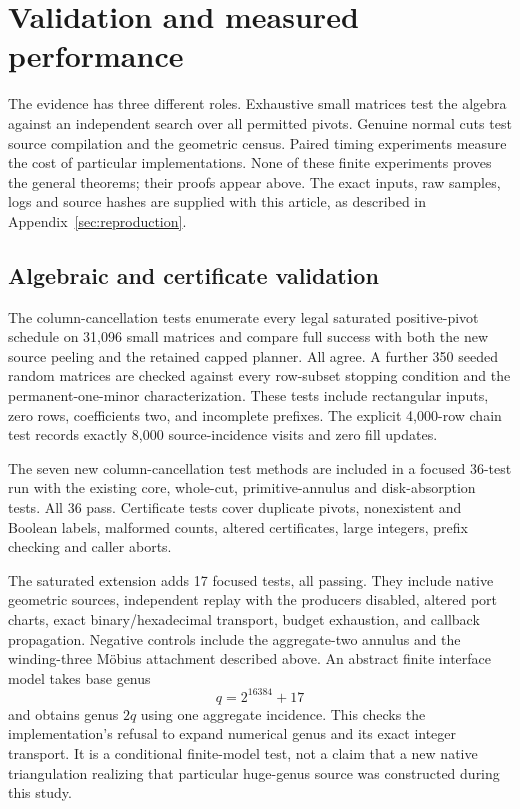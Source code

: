\section{Validation and measured performance}
\label{sec:measurements}

The evidence has three different roles. Exhaustive small matrices test the
algebra against an independent search over all permitted pivots. Genuine
normal cuts test source compilation and the geometric census. Paired timing
experiments measure the cost of particular implementations. None of these
finite experiments proves the general theorems; their proofs appear above.
The exact inputs, raw samples, logs and source hashes are supplied with
this article, as described in Appendix~\ref{sec:reproduction}.

\subsection{Algebraic and certificate validation}

The column-cancellation tests enumerate every legal saturated positive-pivot
schedule on 31,096 small matrices and compare full success with both the
new source peeling and the retained capped planner. All agree. A further
350 seeded random matrices are checked against every row-subset stopping
condition and the permanent-one-minor characterization. These tests include
rectangular inputs, zero rows, coefficients two, and incomplete prefixes.
The explicit 4,000-row chain test records exactly 8,000 source-incidence
visits and zero fill updates.

The seven new column-cancellation test methods are included in a focused
36-test run with the existing core, whole-cut, primitive-annulus and
disk-absorption tests. All 36 pass. Certificate tests cover duplicate
pivots, nonexistent and Boolean labels, malformed counts, altered
certificates, large integers, prefix checking and caller aborts.

The saturated extension adds 17 focused tests, all passing. They include
native geometric sources, independent replay with the producers disabled,
altered port charts, exact binary/hexadecimal transport, budget exhaustion,
and callback propagation. Negative controls include the aggregate-two
annulus and the winding-three M\"obius attachment described above. An
abstract finite interface model takes base genus
\[
 q=2^{16384}+17
\]
and obtains genus $2q$ using one aggregate incidence. This checks the
implementation's refusal to expand numerical genus and its exact integer
transport. It is a conditional finite-model test, not a claim that a new
native triangulation realizing that particular huge-genus source was
constructed during this study.

